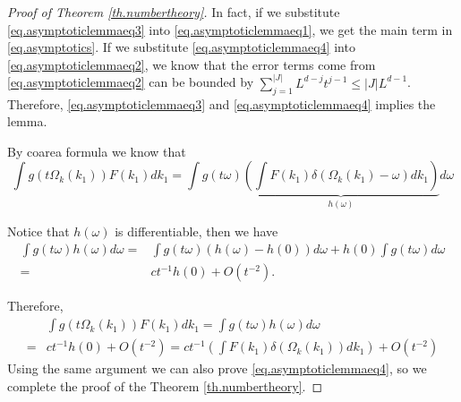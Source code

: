 \begin{proof}[Proof of Theorem \ref{th.numbertheory}]
In fact, if we substitute \eqref{eq.asymptoticlemmaeq3} into \eqref{eq.asymptoticlemmaeq1}, we get the main term in \eqref{eq.asymptotics}. If we substitute \eqref{eq.asymptoticlemmaeq4} into \eqref{eq.asymptoticlemmaeq2}, we know that the error terms come from \eqref{eq.asymptoticlemmaeq2} can be bounded by $\sum^{|J|}_{j=1}L^{d-j}t^{j-1}\le |J| L^{d-1}$. Therefore, \eqref{eq.asymptoticlemmaeq3} and \eqref{eq.asymptoticlemmaeq4} implies the lemma.

By coarea formula we know that
\begin{equation}
    \int g(t\Omega_k(k_1)) F(k_1) dk_1 =\int g(t\omega) \underbrace{\left(\int F(k_1) \delta(\Omega_k(k_1)-\omega)dk_1\right) }_{h(\omega)} d\omega 
\end{equation}

Notice that $h(\omega)$ is differentiable, then we have
\begin{equation}
\begin{split}
    \int g(t\omega)h(\omega) d\omega=&\int g(t\omega)(h(\omega)-h(0)) d\omega + h(0)\int g(t\omega)d\omega
    \\
    = &ct^{-1}h(0) +O(t^{-2}). 
\end{split}
\end{equation}

Therefore, 
\begin{equation}
\begin{split}
    &\int g(t\Omega_k(k_1)) F(k_1) dk_1 =\int g(t\omega)h(\omega)  d\omega 
    \\
    =&ct^{-1}h(0) +O(t^{-2})=ct^{-1}\left(\int F(k_1) \delta(\Omega_k(k_1))dk_1\right)  +O(t^{-2})
\end{split}
\end{equation}
Using the same argument we can also prove \eqref{eq.asymptoticlemmaeq4}, so we complete the proof of the Theorem \ref{th.numbertheory}.
\end{proof}





